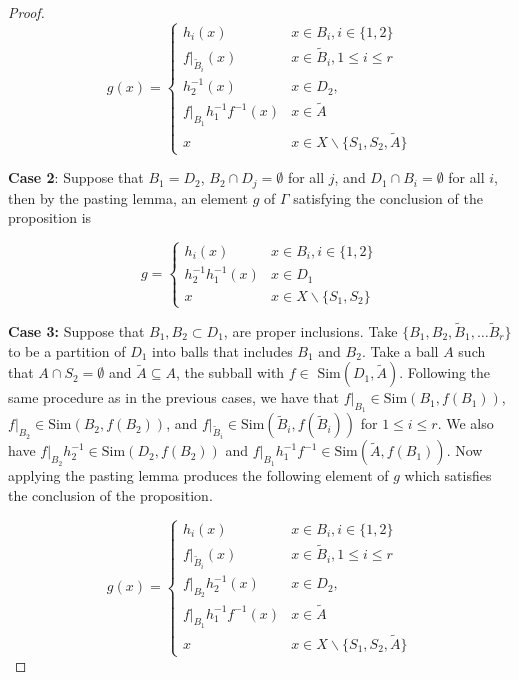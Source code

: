 \documentclass[10pt,a4paper]{amsart}
\begin{document}
\begin{proof}
     \[ g(x) = \begin{cases} h_i(x) & x \in B_i, i\in\{1,2\} \\
     f\vert_{\tilde B_i}(x) & x \in \tilde B_i, 1 \leq i \leq r\\
    h_2^{-1}(x) & x \in D_2, \\
    f\vert_{B_1}h_1^{-1}f^{-1} (x) & x\in \tilde A\\
    x & x \in X \backslash \{S_1, S_2, \tilde A\}
    \end{cases}
    \]

     \noindent\textbf{Case 2}: Suppose that $B_1=D_2$, $B_2 \cap D_j = \emptyset$ for all $j$, and $D_1 \cap B_i = \emptyset$ for all $i$, then by the pasting lemma, an element $g$ of $\Gamma$ satisfying the conclusion of the proposition is

    \[ g = \begin{cases} h_i(x) & x \in B_i, i\in\{1,2\}  \\
    h_2^{-1}h_1^{-1}(x) & x \in D_1 \\
    x & x \in X \backslash \{S_1, S_2\}
    \end{cases}
    \]

    \noindent\textbf{Case 3:} 
    Suppose that $B_1, B_2 \subset D_1$, are proper inclusions. Take $\{B_1, B_2, \tilde B_1, \dots \tilde B_r \}$ to be a partition of $D_1$ into balls that includes $B_1$ and $B_2$. Take a ball $A$ such that $A \cap S_2 =\emptyset$ and $\tilde A \subseteq A$, the subball with $f \in$ $\text{Sim}(D_1, \tilde A)$. Following the same procedure as in the previous cases, we have that $f\vert_{B_1} \in \text{Sim}(B_1, f(B_1))$, $f\vert_{B_2} \in \text{Sim}(B_2, f(B_2))$, and $f\vert_{\tilde B_i} \in \text{Sim}(\tilde B_i, f(\tilde B_i))$ for $1 \leq i \leq r$. We also have $f\vert_{B_2}h_2^{-1} \in \text{Sim}(D_2,f(B_2))$ and $f\vert_{B_1}h_1^{-1}f^{-1} \in \text{Sim}(\tilde A, f(B_1))$. Now applying the pasting lemma produces the following element of $g$ which satisfies the conclusion of the proposition.  

    
     \[ g(x) = \begin{cases} h_i(x) & x \in B_i, i\in\{1,2\}  \\
     f\vert_{\tilde B_i}(x) & x \in \tilde B_i, 1\leq i \leq r\\
    f\vert_{B_2}h_2^{-1}(x) & x \in D_2, \\
    f\vert_{B_1}h_1^{-1}f^{-1} (x) & x\in \tilde A\\
    x & x \in X \backslash \{S_1, S_2, \tilde A\}
    \end{cases}
    \]




\end{proof}
\end{document}
